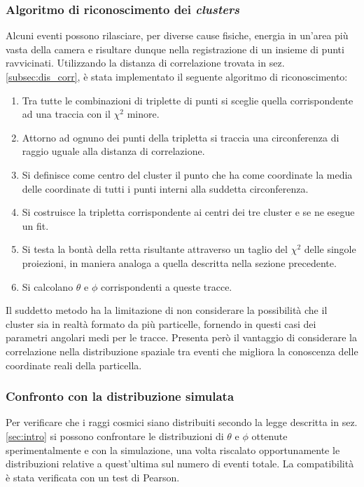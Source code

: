\documentclass[8pt]{extarticle}
\begin{document}
\subsubsection{Algoritmo di riconoscimento dei \textit{clusters}}
Alcuni eventi possono rilasciare, per diverse cause fisiche, energia in un'area più vasta della camera e risultare dunque nella registrazione di un insieme di punti ravvicinati.
Utilizzando la distanza di correlazione trovata in sez. \ref{subsec:dis_corr}, è stata implementato il seguente algoritmo di riconoscimento: \\
\begin{enumerate}
\item Tra tutte le combinazioni di triplette di punti si sceglie quella corrispondente ad una traccia con il $\chi^2$ minore.
\item Attorno ad ognuno dei punti della tripletta si traccia una circonferenza di raggio uguale alla distanza di correlazione.
\item Si definisce come centro del cluster il punto che ha come coordinate la media delle coordinate di tutti i punti interni alla suddetta circonferenza.
\item Si costruisce la tripletta corrispondente ai centri dei tre cluster e se ne esegue un fit.
\item Si testa la bontà della retta risultante attraverso un taglio del $\chi^2$ delle singole proiezioni, in maniera analoga a quella descritta nella sezione precedente.
\item Si calcolano $\theta$ e $\phi$ corrispondenti a queste tracce.
\end{enumerate}

Il suddetto metodo ha la limitazione di non considerare la possibilità che il cluster sia in realtà formato da più particelle, fornendo in questi casi dei parametri angolari medi per le tracce. Presenta però il vantaggio di considerare la correlazione nella distribuzione spaziale tra eventi che migliora la conoscenza delle coordinate reali della particella. 


\subsubsection{Confronto con la distribuzione simulata}
Per verificare che i raggi cosmici siano distribuiti secondo la legge descritta in sez. \ref{sec:intro} si possono confrontare le distribuzioni di $\theta$ e $\phi$ ottenute sperimentalmente e con la simulazione, una volta riscalato opportunamente le distribuzioni relative a quest'ultima sul numero di eventi totale. La compatibilità è stata verificata con un test di Pearson.
\end{document}

